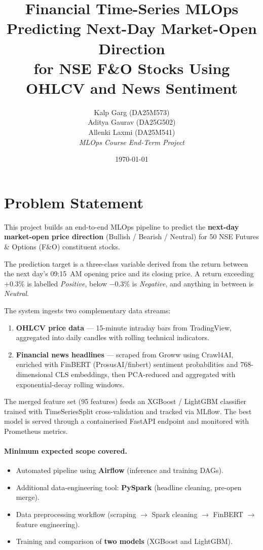 \documentclass[11pt,a4paper]{article}
\title{%
  \textbf{Financial Time-Series MLOps}\\[6pt]
  \large Predicting Next-Day Market-Open Direction\\
  for NSE F\&O Stocks Using OHLCV and News Sentiment
}
\author{
  Kalp Garg (DA25M573)\\
  Aditya Gaurav (DA25G502)\\
  Allenki Laxmi (DA25M541)\\[4pt]
  \textit{MLOps Course End-Term Project}
}
\date{\today}
\begin{document}
\maketitle
\tableofcontents
\newpage

\section{Problem Statement}

This project builds an end-to-end MLOps pipeline to predict the
\textbf{next-day market-open price direction} (Bullish / Bearish / Neutral)
for 50 NSE Futures \& Options (F\&O) constituent stocks.

The prediction target is a three-class variable derived from the return
between the next day's 09:15~AM opening price and its closing price.
A return exceeding $+0.3\%$ is labelled \emph{Positive}, below $-0.3\%$ is
\emph{Negative}, and anything in between is \emph{Neutral}.

The system ingests two complementary data streams:
\begin{enumerate}[nosep]
  \item \textbf{OHLCV price data} — 15-minute intraday bars from TradingView,
        aggregated into daily candles with rolling technical indicators.
  \item \textbf{Financial news headlines} — scraped from Groww using Crawl4AI,
        enriched with FinBERT (ProsusAI/finbert) sentiment probabilities and
        768-dimensional CLS embeddings, then PCA-reduced and aggregated with
        exponential-decay rolling windows.
\end{enumerate}

The merged feature set (95 features) feeds an XGBoost / LightGBM classifier
trained with TimeSeriesSplit cross-validation and tracked via MLflow.
The best model is served through a containerised FastAPI endpoint and monitored
with Prometheus metrics.

\paragraph{Minimum expected scope covered.}
\begin{itemize}[nosep]
  \item Automated pipeline using \textbf{Airflow} (inference and training DAGs).
  \item Additional data-engineering tool: \textbf{PySpark} (headline cleaning, pre-open merge).
  \item Data preprocessing workflow (scraping $\to$ Spark cleaning $\to$ FinBERT $\to$ feature engineering).
  \item Training and comparison of \textbf{two models} (XGBoost and LightGBM).
\end{itemize}
\end{document}

